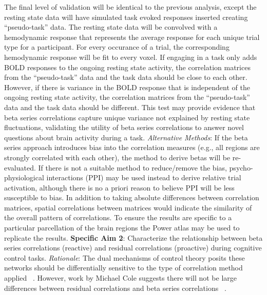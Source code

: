 \documentclass[phd,appendix,figures]{uithesis}
\begin{document}
The final level of validation will be identical to the previous analysis, except the resting state data will have simulated task evoked responses inserted creating “pseudo-task” data.
The resting state data will be convolved with a hemodynamic response that represents the average response for each unique trial type for a participant.
For every occurance of a trial, the corresponding hemodynamic response will be fit to every voxel.
If engaging in a task only adds BOLD responses to the ongoing resting state activity, the correlation matrices from the “pseudo-task” data and the task data should be close to each other.
However, if there is variance in the BOLD response that is independent of the ongoing resting state activity, the correlation matrices from the “pseudo-task” data and the task data should be different.
This test may provide evidence that beta series correlations capture unique variance not explained by resting state fluctuations, validating the utility of beta series correlations to answer novel questions about brain activity during a task.
\newline
\newline
\textit{Alternative Methods}: If the beta series approach introduces bias into the correlation measures (e.g., all regions are strongly correlated with each other), the method to derive betas will be re-evaluated.
If there is not a suitable method to reduce/remove the bias, psycho-physiological interactions (PPI) may be used instead to derive relative trial activation, although there is no a priori reason to believe PPI will be less susceptible to bias.
In addition to taking absolute differences between correlation matrices, spatial correlations between matrices would indicate the similarity of the overall pattern of correlations.
To ensure the results are specific to a particular parcellation of the brain regions the Power atlas may be used to replicate the results.
\newline
\newline
\textbf{Specific Aim 2}: Characterize the relationship between beta series correlations (reactive) and residual correlations (proactive) during cognitive control tasks.
\newline
\newline
\textit{Rationale}: The dual mechanisms of control theory posits these networks should be differentially sensitive to the type of correlation method applied ~\citep{Dosenbach2007,Braver2006}.
However, work by Michael Cole suggests there will not be large differences between residual correlations and beta series correlations ~\citep{Cole2019}.
\end{document}
